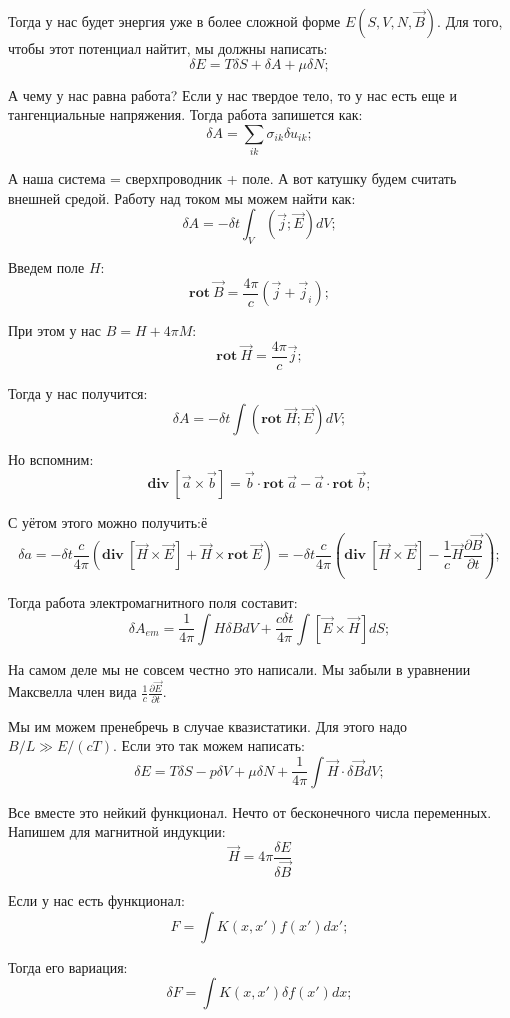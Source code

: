 \documentclass[a4paper, 14pt, russian]{article}
\newcommand{\be}{\begin{equation}}
\newcommand{\ee}{\end{equation}}
\newcommand{\pa}{\partial}
\newcommand{\rot}{\textbf{rot}~}
\renewcommand{\div}{\textbf{div}~}
\begin{document}
	Тогда у нас будет энергия уже в более сложной форме $E(S,V,N, \vec B)$.
	Для того, чтобы этот потенциал найтит, мы должны написать:
	\be
		\delta E = T \delta S + \delta A + \mu \delta N;
	\ee

	А чему у нас равна работа? Если у нас твердое тело, то 
	у нас есть еще и тангенциальные напряжения. Тогда работа запишется как:
	\be
		\delta A = \sum_{ik} \sigma_{ik} \delta u_{ik};
	\ee

	А наша система =  сверхпроводник + поле. А вот катушку будем считать 
	внешней средой. Работу над током мы можем найти как:
	\be
		\delta A = - \delta t\int_V (\vec j; \vec E) d V;
	\ee

	Введем поле $H$:
	\be
		\rot \vec B = \frac{4\pi}{c} (\vec j + \vec{j}_i);
	\ee

	При этом у нас $B = H + 4\pi M$:
	\be
		\rot \vec H = \frac{4\pi}{c} \vec j;
	\ee

	Тогда у нас получится:
	\be
		\delta A = - \delta t \int (\rot \vec H; \vec E) dV;
	\ee

	Но вспомним:
	\be
		\div [\vec a \times \vec b] = \vec b \cdot \rot \vec a - \vec a \cdot \rot \vec b;
	\ee

	С уётом этого можно получить:ё
	\be
		\delta a = - \delta t \frac{c}{4\pi} \left(\div [\vec H \times \vec E] 
		+ \vec H \times \rot \vec E\right) = 
		- \delta t \frac{c}{4\pi} \left(\div [\vec H \times \vec E]
		- \frac{1}{c} \vec H \frac{\pa \vec B}{\pa t}\right);
	\ee

	Тогда работа электромагнитного поля составит:
	\be
		\delta A_{em} =  \frac{1}{4\pi} \int H \delta B d V + 
		\frac{c\delta t}{4\pi} \int [\vec E \times \vec H] dS;
	\ee

	На самом деле мы не совсем честно это написали. Мы забыли в
	уравнении Максвелла член вида $\frac{1}{c} \frac{\pa \vec E}{\pa t}$.

	Мы им можем пренебречь в случае квазистатики. Для этого надо
	$B/L \gg E /(c T)$. Если это так можем написать:
	\be
		\delta E = T \delta S - p \delta V + \mu \delta N + 
			\frac{1}{4\pi} \int \vec H \cdot \delta \vec B dV;
	\ee

	Все вместе это нейкий функционал. Нечто от бесконечного числа переменных.
	Напишем для магнитной индукции:
	\be
		\vec H = 4\pi \frac{\delta E}{\delta \vec B}
	\ee

	Если у нас есть функционал:
	\be
		F = \int K(x, x') f(x') dx';
	\ee

	Тогда его вариация:
	\be
		\delta F = \int K(x, x') \delta f (x') dx;
	\ee
\end{document}

